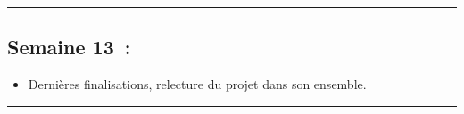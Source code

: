 \documentclass[12pt, letterpaper, twoside]{article}
\begin{document}
\rule{\textwidth}{0.4pt}

\subsection{Semaine 13 :}
\begin{itemize}
\item Dernières finalisations, relecture du projet dans son ensemble.
\end{itemize}

\rule{\textwidth}{0.4pt}
\end{document}
